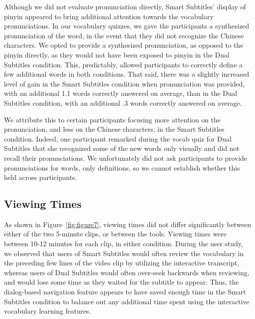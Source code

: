 \documentclass{sigchi}
\begin{document}
Although we did not evaluate pronunciation directly, Smart Subtitles' display of pinyin appeared to bring additional attention towards the vocabulary pronunciations. In our vocabulary quizzes, we gave the participants a synthesized pronunciation of the word, in the event that they did not recognize the Chinese characters. We opted to provide a synthesized pronunciation, as opposed to the pinyin directly, as they would not have been exposed to pinyin in the Dual Subtitles condition. This, predictably, allowed participants to correctly define a few additional words in both conditions. That said, there was a slightly increased level of gain in the Smart Subtitles condition when pronunciation was provided, with an additional 1.1 words correctly answered on average, than in the Dual Subtitles condition, with an additional .3 words correctly answered on average.

We attribute this to certain participants focusing more attention on the pronunciation, and less on the Chinese characters, in the Smart Subtitles condition. Indeed, one participant remarked during the vocab quiz for Dual Subtitles that she recognized some of the new words only visually and did not recall their pronunciations. We unfortunately did not ask participants to provide pronunciations for words, only definitions, so we cannot establish whether this held across participants.

\subsection{Viewing Times}

As shown in Figure~\ref{fig:figure7}, viewing times did not differ significantly between either of the two 5-minute clips, or between the tools. Viewing times were between 10-12 minutes for each clip, in either condition.
During the user study, we observed that users of Smart Subtitles would often review the vocabulary in the preceding few lines of the video clip by utilizing the interactive transcript, whereas users of Dual Subtitles would often over-seek backwards when reviewing, and would lose some time as they waited for the subtitle to appear.
Thus, the dialog-based navigation feature appears to have saved enough time in the Smart Subtitles condition to balance out any additional time spent using the interactive vocabulary learning features.
\end{document}
